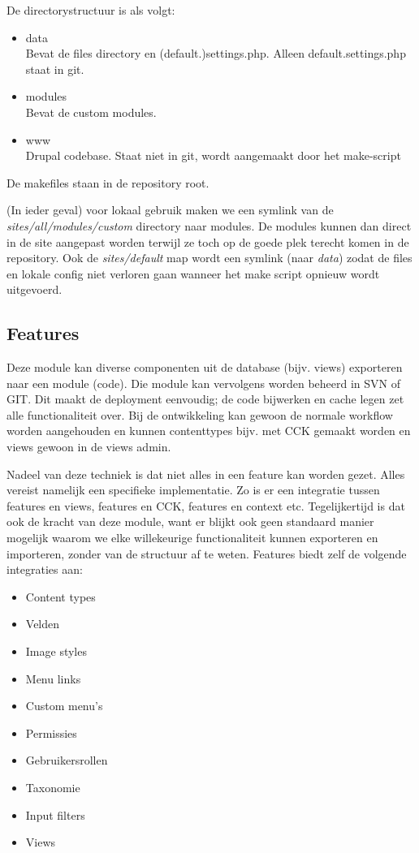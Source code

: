 De directorystructuur is als volgt:

\begin{itemize}
\item data \\
    Bevat de files directory en (default.)settings.php. Alleen default.settings.php staat in git.
\item modules \\
    Bevat de custom modules.
\item www \\
    Drupal codebase. Staat niet in git, wordt aangemaakt door het make-script
\end{itemize}

De makefiles staan in de repository root.

(In ieder geval) voor lokaal gebruik maken we een symlink van de \emph{sites/all/modules/custom} directory naar {modules}. De modules kunnen dan direct in de site aangepast worden terwijl ze toch op de goede plek terecht komen in de repository. Ook de \emph{sites/default} map wordt een symlink (naar \emph{data}) zodat de files en lokale config niet verloren gaan wanneer het make script opnieuw wordt uitgevoerd.

\subsection{Features}

Deze module kan diverse componenten uit de database (bijv. views) exporteren naar een  module (code). Die module kan vervolgens worden beheerd in SVN of GIT. Dit maakt de deployment eenvoudig; de code bijwerken en cache legen zet alle functionaliteit over. Bij de ontwikkeling kan gewoon de normale workflow worden aangehouden en kunnen contenttypes bijv. met CCK gemaakt worden en views gewoon in de views admin.

Nadeel van deze techniek is dat niet alles in een feature kan worden gezet. Alles vereist namelijk een specifieke implementatie. Zo is er een integratie tussen features en views, features en CCK, features en context etc. Tegelijkertijd is dat ook de kracht van deze module, want er blijkt ook geen standaard manier mogelijk waarom we elke willekeurige functionaliteit kunnen exporteren en importeren, zonder van de structuur af te weten. Features biedt zelf de volgende integraties aan:

\begin{itemize}
  \item Content types
  \item Velden
  \item Image styles
  \item Menu links
  \item Custom menu's
  \item Permissies
  \item Gebruikersrollen
  \item Taxonomie
  \item Input filters
  \item Views
\end{itemize}


